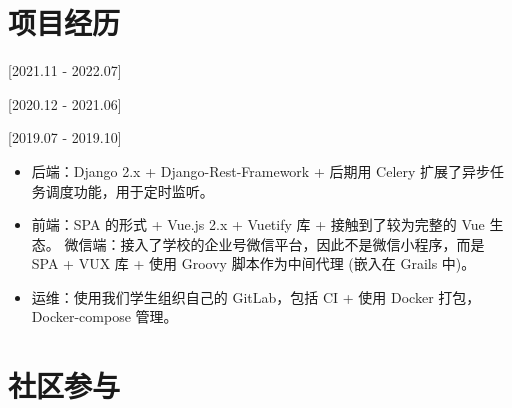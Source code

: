 \documentclass{resume}
\begin{document}
\section{项目经历}

[2021.11 - 2022.07] 

[2020.12 - 2021.06] 

[2019.07 - 2019.10] 

\begin{itemize}
 \item 后端：Django 2.x + Django-Rest-Framework + 后期用 Celery 扩展了异步任务调度功能，用于定时监听。
 \item 前端：SPA 的形式 + Vue.js 2.x + Vuetify 库 + 接触到了较为完整的 Vue 生态。
微信端：接入了学校的企业号微信平台，因此不是微信小程序，而是 SPA + VUX 库 + 使用 Groovy 脚本作为中间代理
(嵌入在 Grails 中)。
 \item 运维：使用我们学生组织自己的 GitLab，包括 CI + 使用 Docker 打包，Docker-compose 管理。
\end{itemize}

\section{社区参与}
\end{document}
